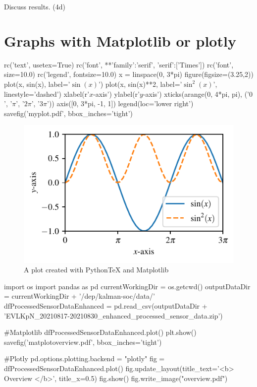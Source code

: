 Discuss results.  (4d)

\section{Graphs with Matplotlib or plotly}


\begin{pylabcode}[plotsession]
rc('text', usetex=True)
rc('font', **{'family':'serif', 'serif':['Times']})
rc('font', size=10.0)			
rc('legend', fontsize=10.0)
x = linspace(0, 3*pi)
figure(figsize=(3.25,2))
plot(x, sin(x), label='$\sin(x)$')
plot(x, sin(x)**2, label='$\sin^2(x)$',
linestyle='dashed')
xlabel(r'$x$-axis')
ylabel(r'$y$-axis')
xticks(arange(0, 4*pi, pi), ('$0$',
'$\pi$', '$2\pi$', '$3\pi$'))
axis([0, 3*pi, -1, 1])
legend(loc='lower right')
savefig('myplot.pdf', bbox_inches='tight')
\end{pylabcode}

\begin{figure}[!ht]
\includegraphics{myplot}
\caption{\label{fig:matplotlib} A plot created with PythonTeX and Matplotlib}
\end{figure}

\begin{pylabcode}
import os 
import pandas as pd
currentWorkingDir =  os.getcwd()
outputDataDir = currentWorkingDir + '/dep/kalman-soc/data/'
dfProcessedSensorDataEnhanced = pd.read_csv(outputDataDir + 'EVLKpN_20210817-20210830_enhanced_processed_sensor_data.zip')  

#Matplotlib
dfProcessedSensorDataEnhanced.plot()
plt.show()
savefig('matplotoverview.pdf', bbox_inches='tight')

#Plotly
pd.options.plotting.backend = "plotly"
fig = dfProcessedSensorDataEnhanced.plot()
fig.update_layout(title_text='<b> Overview  </b>', title_x=0.5)
fig.show()
fig.write_image("overview.pdf")
\end{pylabcode}
	
